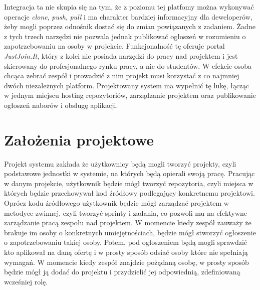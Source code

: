 Integracja ta nie skupia się na tym, że z poziomu tej platfomy można wykonywać operacje \textit{clone}, \textit{push}, \textit{pull} i ma charakter bardziej informacyjny
dla deweloperów, żeby mogli poprzez odnośnik dostać się do zmian powiązanych z zadaniem.
Żadne z tych trzech narzędzi nie pozwala jednak publikować ogłoszeń w rozumieniu  o zapotrzebowaniu na osoby w projekcie.
Funkcjonalność tę oferuje portal \emph{JustJoin.It}, który z kolei nie posiada narzędzi do pracy nad projektem i jest skierowany do profesjonalnego rynku pracy, a nie do studentów.
W efekcie osoba chcąca zebrać zespół i prowadzić z nim projekt musi korzystać z co najmniej dwóch niezależnych platform.
Projektowany system ma wypełnić tę lukę, łącząc w jednym miejscu hosting repozytoriów, zarządzanie projektem oraz publikowanie ogłoszeń naborów i obsługę aplikacji.

\section{Założenia projektowe}

Projekt systemu zakłada że użytkownicy będą mogli tworzyć projekty, czyli podstawowe jednostki w systemie, na których będą opierali swoją pracę.
Pracując w danym projekcie, użytkownik będzie mógł tworzyć repozytoria, czyli miejsca w których będzie przechowywał kod źródłowy podlegający konkretnemu projektowi.
Oprócz kodu źródłowego użytkownik będzie mógł zarządzać projektem w metodyce zwinnej, czyli tworzyć sprinty i zadania, co pozwoli mu na efektywne zarządzanie pracą zespołu nad projektem.
W momencie kiedy zespół zauważy że brakuje im osoby o konkretnych umiejętnościach, będzie mógł stworzyć ogłoszenie o zapotrzebowaniu takiej osoby. Potem,
pod ogłoszeniem będą mogli sprawdzić kto aplikował na daną ofertę i w prosty sposób odsiać osoby które nie spełniają wymagań. W momencie kiedy zespół znajdzie pożądaną osobę,
w prosty sposób będzie mógł ją dodać do projektu i przydzielić jej odpowiednią, zdefiniowaną wcześniej rolę.

